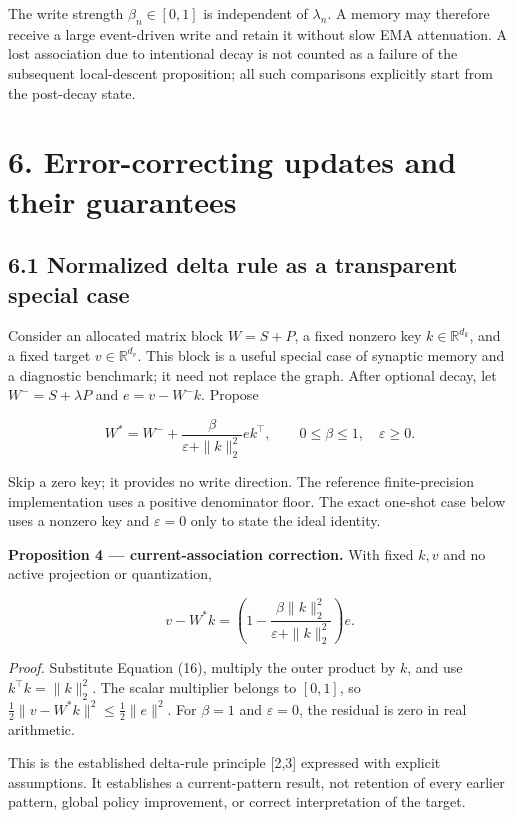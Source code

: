 \documentclass[
  11pt,
  a4paper,
]{article}
\begin{document}
The write strength \(\beta_n\in[0,1]\) is independent of \(\lambda_n\).
A memory may therefore receive a large event-driven write and retain it
without slow EMA attenuation. A lost association due to intentional
decay is not counted as a failure of the subsequent local-descent
proposition; all such comparisons explicitly start from the post-decay
state.

\section{6. Error-correcting updates and their
guarantees}\label{error-correcting-updates-and-their-guarantees}

\subsection{6.1 Normalized delta rule as a transparent special
case}\label{normalized-delta-rule-as-a-transparent-special-case}

Consider an allocated matrix block \(W=S+P\), a fixed nonzero key
\(k\in\mathbb R^{d_k}\), and a fixed target \(v\in\mathbb R^{d_v}\).
This block is a useful special case of synaptic memory and a diagnostic
benchmark; it need not replace the graph. After optional decay, let
\(W^-=S+\lambda P\) and \(e=v-W^-k\). Propose

\[
W^*=W^-+\frac{\beta}{\varepsilon+\|k\|_2^2}ek^\top,
\qquad 0\le\beta\le1,\quad\varepsilon\ge0.
\tag{16}
\]

Skip a zero key; it provides no write direction. The reference
finite-precision implementation uses a positive denominator floor. The
exact one-shot case below uses a nonzero key and \(\varepsilon=0\) only
to state the ideal identity.

\textbf{Proposition 4 --- current-association correction.} With fixed
\(k,v\) and no active projection or quantization,

\[
v-W^*k=
\left(1-\frac{\beta\|k\|_2^2}{\varepsilon+\|k\|_2^2}\right)e.
\tag{17}
\]

\emph{Proof.} Substitute Equation (16), multiply the outer product by
\(k\), and use \(k^\top k=\|k\|_2^2\). The scalar multiplier belongs to
\([0,1]\), so \(\tfrac12\|v-W^*k\|^2\le\tfrac12\|e\|^2\). For
\(\beta=1\) and \(\varepsilon=0\), the residual is zero in real
arithmetic.

This is the established delta-rule principle {[}2,3{]} expressed with
explicit assumptions. It establishes a current-pattern result, not
retention of every earlier pattern, global policy improvement, or
correct interpretation of the target.
\end{document}
